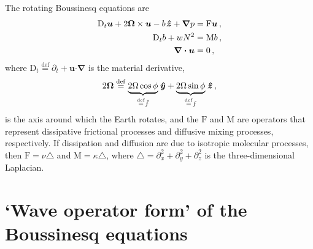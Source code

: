 \documentclass[12pt, oneside]{article}
\newcommand{\com}{\, ,}
\newcommand{\defn}{\ensuremath{\stackrel{\mathrm{def}}{=}}}
\newcommand{\beq}{\begin{equation}}
\newcommand{\eeq}{\end{equation}}
\newcommand{\p}{\partial}
\newcommand{\bnabla}{\boldsymbol \nabla}
\newcommand{\bcdot}{\boldsymbol \cdot}
\newcommand{\lap}{\triangle}
\newcommand{\bu}{\boldsymbol u}
\newcommand{\byh}{\hspace{0.1em}\boldsymbol{\hat y}}
\newcommand{\bzh}{\hspace{0.1em}\boldsymbol{\hat z}}
\newcommand{\bOmega}{\boldsymbol \Omega}
\newcommand{\kap}{\kappa}
\newcommand{\Dt}[1]{\mathrm{D}_t #1}
\newcommand{\friction}{\mathrm{F}}
\newcommand{\mixing}{\mathrm{M}}
\begin{document}
The rotating Boussinesq equations are
\begin{align}
\Dt{\bu} + 2 \bOmega \times \bu - b \bzh + \bnabla p &= \friction \bu \com \label{mom} \\
\Dt{b} + w N^2 &= \mixing b \com \label{buoy} \\
\bnabla \bcdot \bu &= 0 \com \label{cont}
\end{align}
where $\Dt \defn \p_t + \bu \bcdot \bnabla$ is the material derivative, 
\beq
2 \bOmega \defn \underbrace{2 \Omega \cos \phi}_{\defn \breve f} \byh + \underbrace{2 \Omega \sin \phi}_{\defn f} \bzh \com
\eeq
is the axis around which the Earth rotates, and the $\friction$ and $\mixing$ are operators that represent dissipative frictional processes and diffusive mixing processes, respectively. If dissipation and diffusion are due to isotropic molecular processes, then $\friction = \nu \lap$ and $\mixing = \kap \lap$, where $\lap = \p_x^2 + \p_y^2 + \p_z^2$ is the three-dimensional Laplacian. 

\section{`Wave operator form' of the Boussinesq equations}
\label{waveOperatorForm}
\end{document}
